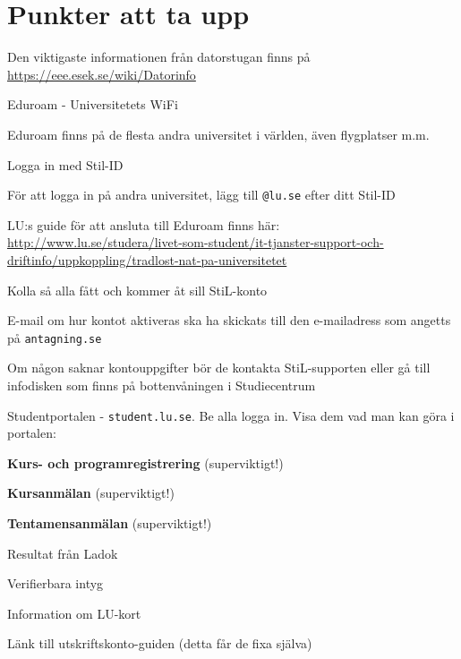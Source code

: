 \documentclass[10pt]{article}
\begin{document}
	\section{Punkter att ta upp}
	\begin{dashlist}
		\item Den viktigaste informationen från datorstugan finns på \url{https://eee.esek.se/wiki/Datorinfo}

		\item Eduroam - Universitetets WiFi
		\begin{dashlist}
			\item Eduroam finns på de flesta andra universitet i världen, även flygplatser m.m.
			\item Logga in med Stil-ID
			\item För att logga in på andra universitet, lägg till \texttt{@lu.se} efter ditt Stil-ID
			\item LU:s guide för att ansluta till Eduroam finns här:\\
			\url{http://www.lu.se/studera/livet-som-student/it-tjanster-support-och-driftinfo/uppkoppling/tradlost-nat-pa-universitetet}
		\end{dashlist}

		\item Kolla så alla fått och kommer åt sill StiL-konto
		\begin{dashlist}
			\item E-mail om hur kontot aktiveras ska ha skickats till den e-mailadress som angetts på \texttt{antagning.se}
			\item Om någon saknar kontouppgifter bör de kontakta StiL-supporten eller gå till infodisken som finns på bottenvåningen i Studiecentrum
		\end{dashlist}

		\newpage

		\item Studentportalen - \texttt{student.lu.se}. Be alla logga in. Visa dem vad man kan göra i portalen:
		\begin{dashlist}
			\item \textbf{Kurs- och programregistrering} (superviktigt!)
			\item \textbf{Kursanmälan} (superviktigt!)
			\item \textbf{Tentamensanmälan} (superviktigt!)
			\item Resultat från Ladok
			\item Verifierbara intyg
			\item Information om LU-kort
			\item Länk till utskriftskonto-guiden (detta får de fixa själva)


\end{dashlist}
\end{dashlist}
\end{document}
